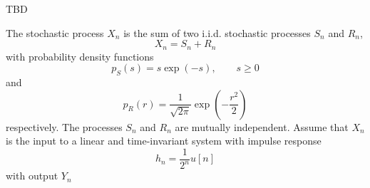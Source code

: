 \ifspanish

TBD

\else

The stochastic process  $X_n$ is the sum of two i.i.d. stochastic processes $S_n$ and $R_n$,
\[
X_n = S_n + R_n
\]
with probability density functions
\[
p_{S}(s) = s \exp(-s), \qquad s \ge 0
\]
and
\[
p_{R}(r) = \frac{1}{\sqrt{2\pi}} \exp\left(-\frac{r^2}{2} \right)
\]
respectively. The processes $S_n$ and $R_n$ are mutually independent. Assume that $X_n$ is the input to a linear and time-invariant system with impulse response
\[
h_n = \frac1{2^n} u[n]
\]
with output $Y_n$


